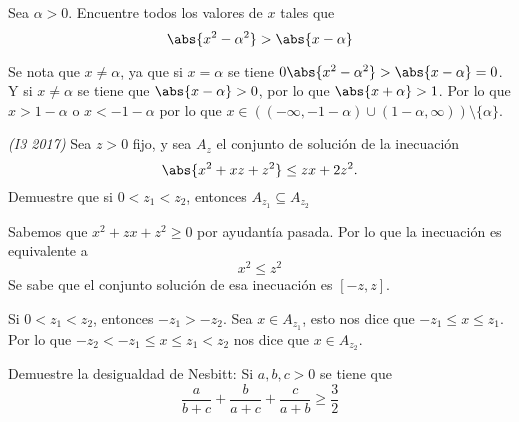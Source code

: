 \documentclass{ayudantia}
\begin{document}
\begin{prob}
    Sea \(\alpha>0\). Encuentre todos los valores de \(x\) tales que
    \begin{equation*}
        \abs{x^2-\alpha^2}>\abs{x-\alpha}
    \end{equation*}
\end{prob}

\begin{ans}
    \begin{sol}
        Se nota que \(x\neq\alpha\), ya que si \(x=\alpha\) se tiene \(0\abs{x^2-\alpha^2}>\abs{x-\alpha}=0\). Y si \(x\neq\alpha\) se tiene que \(\abs{x-\alpha}>0\), por lo que \(\abs{x+\alpha}>1\). Por lo que \(x>1-\alpha\) o \(x<-1-\alpha\) por lo que \(x\in((-\infty,-1-\alpha)\cup(1-\alpha,\infty))\setminus\{\alpha\}\).
    \end{sol}
\end{ans}



\begin{prob}
    \textit{(I3 2017)} Sea \(z>0\) fijo, y sea \(A_z\) el conjunto de solución de la inecuación
    \begin{equation*}
        \abs{x^2+xz+z^2}\leq zx+2z^2.
    \end{equation*}
    Demuestre que si \(0<z_1<z_2\), entonces \(A_{z_1}\subseteq A_{z_2}\)
\end{prob}

\begin{ans}
    \begin{sol}
        Sabemos que \(x^2+zx+z^2\geq0\) por ayudantía pasada. Por lo que la inecuación es equivalente a
        \begin{equation*}
            x^2\leq z^2
        \end{equation*}
        Se sabe que el conjunto solución de esa inecuación es \([-z,z]\).

        Si \(0<z_1<z_2\), entonces \(-z_1>-z_2\). Sea \(x\in A_{z_1}\), esto nos dice que \(-z_1\leq x\leq z_1\). Por lo que \(-z_2< -z_1\leq x\leq z_1< z_2\) nos dice que \(x\in A_{z_2}\).
    \end{sol}
\end{ans}


\begin{prob}
    Demuestre la desigualdad de Nesbitt: Si \(a,b,c>0\) se tiene que
    \begin{equation*}
        \frac{a}{b+c}+\frac{b}{a+c}+\frac{c}{a+b}\geq\frac32
    \end{equation*}
\end{prob}
\end{document}
